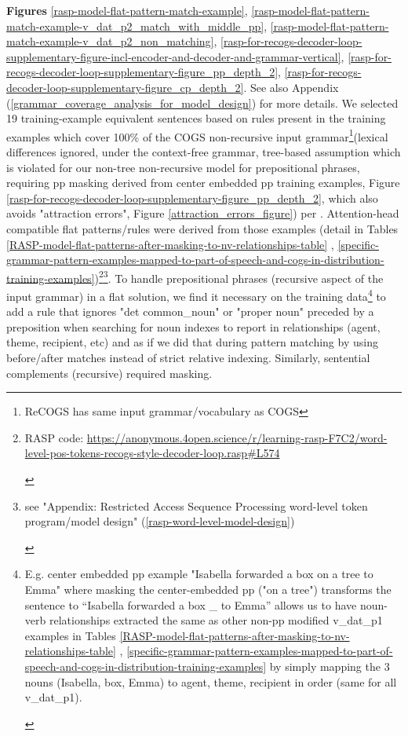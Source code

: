 \documentclass[11pt]{article}
\begin{document}
\textbf{Figures} \ref{rasp-model-flat-pattern-match-example}, \ref{rasp-model-flat-pattern-match-example-v_dat_p2_match_with_middle_pp}, \ref{rasp-model-flat-pattern-match-example-v_dat_p2_non_matching}, \ref{rasp-for-recogs-decoder-loop-supplementary-figure-incl-encoder-and-decoder-and-grammar-vertical}, \ref{rasp-for-recogs-decoder-loop-supplementary-figure_pp_depth_2}, \ref{rasp-for-recogs-decoder-loop-supplementary-figure_cp_depth_2}. See also Appendix (\ref{grammar_coverage_analysis_for_model_design}) for more details. We selected 19 training-example equivalent sentences based on rules present in the training examples which cover 100\% of the COGS non-recursive input grammar\footnote{ReCOGS has same input grammar/vocabulary as COGS}(lexical differences ignored, under the context-free grammar, tree-based assumption which is violated for our non-tree non-recursive model for prepositional phrases, requiring pp masking derived from center embedded pp training examples, Figure \ref{rasp-for-recogs-decoder-loop-supplementary-figure_pp_depth_2}, which also avoids "attraction errors", Figure \ref{attraction_errors_figure}) per \cite{fuzzingbook2023:GrammarCoverageFuzzer}.
Attention-head compatible flat patterns/rules were derived from those examples (detail in Tables \ref{RASP-model-flat-patterns-after-masking-to-nv-relationships-table} , \ref{specific-grammar-pattern-examples-mapped-to-part-of-speech-and-cogs-in-distribution-training-examples})\footnote{\begin{footnotesize}RASP code: \href{https://anonymous.4open.science/r/learning-rasp-F7C2/word-level-pos-tokens-recogs-style-decoder-loop.rasp\#L574}{https://anonymous.4open.science/r/learning-rasp-F7C2/word-level-pos-tokens-recogs-style-decoder-loop.rasp\#L574}\end{footnotesize}}\footnote{\begin{footnotesize}see "Appendix: Restricted Access Sequence Processing word-level token program/model design" (\ref{rasp-word-level-model-design})\end{footnotesize}}.
To handle prepositional phrases (recursive aspect of the input grammar) in a flat solution, we find it necessary on the training data\footnote{\begin{footnotesize}E.g. center embedded pp example "Isabella forwarded a box on a tree to Emma" where masking the center-embedded pp ("on a tree") transforms the sentence to “Isabella forwarded a box \_ to Emma” allows us to have noun-verb relationships extracted the same as other non-pp modified v\_dat\_p1 examples in Tables \ref{RASP-model-flat-patterns-after-masking-to-nv-relationships-table} , \ref{specific-grammar-pattern-examples-mapped-to-part-of-speech-and-cogs-in-distribution-training-examples} by simply mapping the 3 nouns (Isabella, box, Emma) to agent, theme, recipient in order (same for all v\_dat\_p1).\end{footnotesize}} to add a rule that ignores "det common\_noun" or "proper noun" preceded by a preposition when searching for noun indexes to report in relationships (agent, theme, recipient, etc) and as if we did that during pattern matching by using before/after matches instead of strict relative indexing. Similarly, sentential complements (recursive) required masking.
\end{document}
